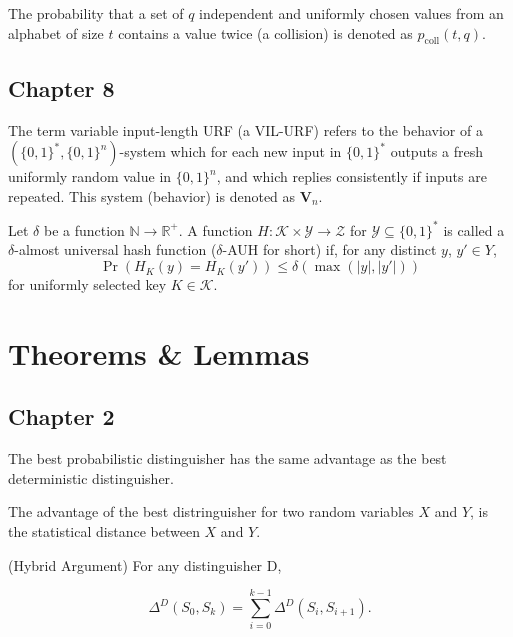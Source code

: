 \documentclass[a4paper,german]{article}
\newenvironment{customdef}[1]{\renewcommand\theinnercustomdef{#1}\innercustomdef}{\endinnercustomdef}
\newenvironment{customlem}[1]{\renewcommand\theinnercustomlem{#1}\innercustomlem}{\endinnercustomlem}
\begin{document}
\begin{customdef}{6.35}
  The probability that a set of $q$ independent and uniformly chosen values from an alphabet of size $t$ contains a value twice (a collision) is denoted as $p_{\mathrm{coll}}(t,q)$.
\end{customdef}

\subsection*{Chapter 8}
\begin{customdef}{8.2}
  The term variable input-length URF (a VIL-URF) refers to the behavior of a $(\{0,1\}^*,\{0,1\}^n)$-system which for each new input in $\{0,1\}^*$ outputs a fresh uniformly random value in $\{0,1\}^n$, and which replies consistently if inputs are repeated. This system (behavior) is denoted as $\mathbf{V}_n$.
\end{customdef}

\begin{customdef}{8.3}
  Let $\delta$ be a function $\mathbb{N} \rightarrow \mathbb{R}^+$. A function $H : \mathcal{K} \times \mathcal{Y} \rightarrow \mathcal{Z}$ for $\mathcal{Y} \subseteq \{0,1\}^{*}$ is called a $\delta$-almost universal hash function ($\delta$-AUH for short) if, for any distinct $y$, $y' \in Y$,
  \[
		\Pr(H_K(y) = H_K(y')) \leq \delta(\max(|y|, |y'|))
	\]
  for uniformly selected key $K \in \mathcal{K}$.
\end{customdef}


\section*{Theorems \& Lemmas}
\subsection*{Chapter 2}
\begin{customlem}{2.0}
	The best probabilistic distinguisher has the same advantage as the best deterministic distinguisher.
\end{customlem}

\begin{customlem}{2.1}
	The advantage of the best distringuisher for two random variables $X$ and $Y$, is the statistical distance between $X$ and $Y$.
\end{customlem}

\begin{customlem}{2.2}
  (Hybrid Argument)
	For any distinguisher D,

	\[
		\Delta^D(S_0, S_k) = \sum\limits_{i=0}^{k-1} \Delta^D(S_i, S_{i+1})
	.\]
\end{customlem}
\end{document}
